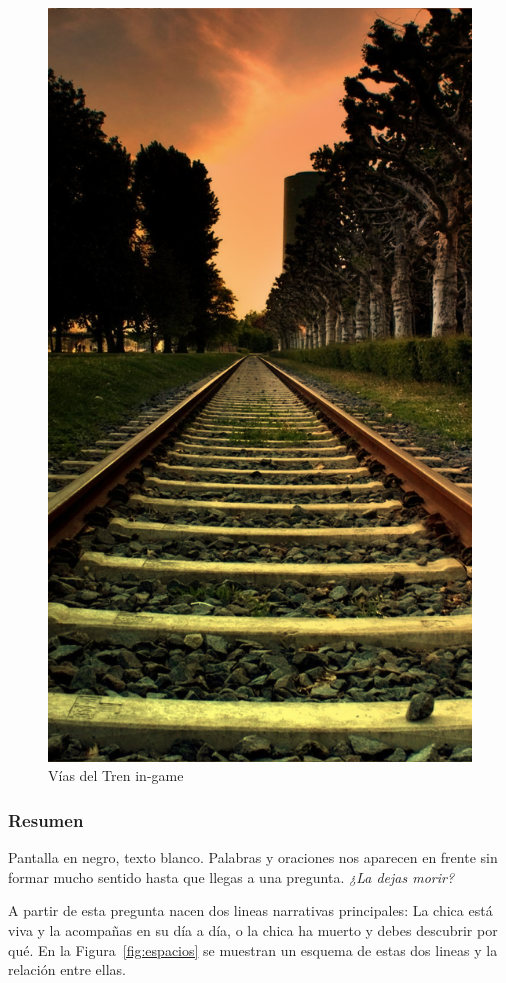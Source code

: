 \begin{figure}[ht]
\begin{minipage}{.24\textwidth}
        \includegraphics[width=.9\textwidth]{imgs/vias-tarde.jpg}
    \end{minipage}
    \caption{Vías del Tren in-game}
    \label{multifig:vias}
\end{figure}

\subsubsection{Resumen}
Pantalla en negro, texto blanco. Palabras y oraciones nos aparecen en frente sin formar mucho sentido hasta que llegas a una pregunta. \emph{¿La dejas morir?}

A partir de esta pregunta nacen dos lineas narrativas principales: La chica está viva y la acompañas en su día a día, o la chica ha muerto y debes descubrir por qué. En la Figura~\ref{fig:espacios} se muestran un esquema de estas dos lineas y la relación entre ellas. 

